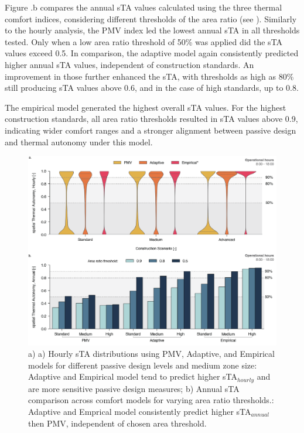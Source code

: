 Figure .b compares the annual sTA values calculated using the three thermal comfort indices, considering different thresholds of the area ratio (see ). Similarly to the hourly analysis, the PMV index led the lowest annual sTA in all thresholds tested. Only when a low area ratio threshold of 50\% was applied did the sTA values exceed 0.5. In comparison, the adaptive model again consistently predicted higher annual sTA values, independent of construction standards. An improvement in those further enhanced the sTA, with thresholds as high as 80\% still producing sTA values above 0.6, and in the case of high standards, up to 0.8.

The empirical model generated the highest overall sTA values. For the highest construction standards, all area ratio thresholds resulted in sTA values above 0.9, indicating wider comfort ranges and a stronger alignment between passive design and thermal autonomy under this model.

\begin{figure}[h!]
    \centering
    \includegraphics[width=\textwidth]{manuscript/src/figures/model-comparison.png}
    \caption{a) a) Hourly sTA distributions using PMV, Adaptive, and Empirical models for different passive design levels and medium zone size: Adaptive and Empirical model tend to predict higher sTA$_{hourly}$ and are more sensitive passive design measures; b) Annual sTA comparison across comfort models for varying area ratio thresholds.: Adaptive and Emprical model consistently predict higher sTA$_{annual}$ then PMV, independent of chosen area threshold.}
    \label{fig:model-comparison}
\end{figure}


